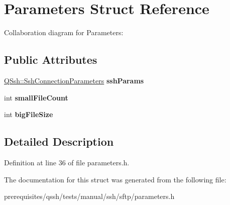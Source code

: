 \hypertarget{struct_parameters}{}\section{Parameters Struct Reference}
\label{struct_parameters}


Collaboration diagram for Parameters\+:
\subsection*{Public Attributes}
\begin{DoxyCompactItemize}
\item 
\mbox{\label{struct_parameters_a5323c153b476021fd4f99851729efd29}} 
\mbox{\hyperlink{class_q_ssh_1_1_ssh_connection_parameters}{Q\+Ssh\+::\+Ssh\+Connection\+Parameters}} {\bfseries ssh\+Params}
\item 
\mbox{\label{struct_parameters_aded8a02a4ca1a7a4bb7082fcde2fea4a}} 
int {\bfseries small\+File\+Count}
\item 
\mbox{\label{struct_parameters_a39b693d8b45b749db7e9a13d9e51050d}} 
int {\bfseries big\+File\+Size}
\end{DoxyCompactItemize}


\subsection{Detailed Description}


Definition at line 36 of file parameters.\+h.



The documentation for this struct was generated from the following file\+:\begin{DoxyCompactItemize}
\item 
prerequisites/qssh/tests/manual/ssh/sftp/parameters.\+h\end{DoxyCompactItemize}
